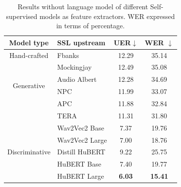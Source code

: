\begin{table}[h]
  \centering
  \begin{tabular}{clcc}
  \hline
  Model type                      &  SSL upstream    & UER$\downarrow$ & WER $\downarrow$ \\ \hline
  Hand-crafted                    & Fbanks         & 12.29                                                           & 35.14            \\ \hline
  \multirow{4}{*}{Generative}     & Mockingjay     & 12.49                                                           & 35.08          \\
                                  & Audio Albert   & 12.28                                                           & 34.69          \\
                                  & NPC   & 11.99                                                           & 33.07          \\
                                  & APC            & 11.88                                                           & 32.84          \\
                                  & TERA           & 11.31                                                           & 31.80          \\ \hline
  \multirow{5}{*}{Discriminative} & Wav2Vec2 Base  & 7.37                                                            & 19.76          \\
                                  & Wav2Vec2 Large & 7.00                                                            & 18.76          \\
                                  & Distill HuBERT & 9.22                                                            & 25.75          \\
                                  & HuBERT Base    & 7.40                                                            & 19.77          \\
                                  & HuBERT Large   & \textbf{6.03}                                                   & \textbf{15.41} \\ \hline
  \end{tabular}
  \caption{Results without language model of different Self-supervised models as feature extractors. WER expressed in terms of percentage.}
\label{tab:SSL}
  \end{table}

